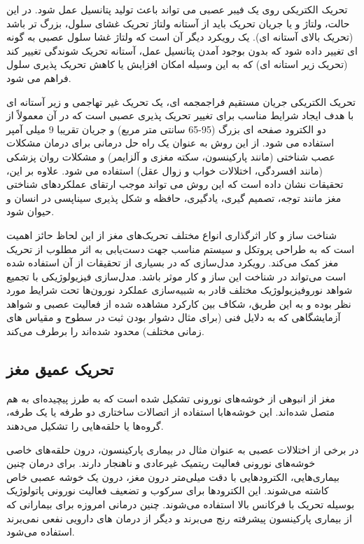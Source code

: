 تحریک الکتریکی روی یک فیبر عصبی می تواند باعث تولید پتانسیل عمل شود. در این حالت، ولتاژ و یا جریان تحریک باید از آستانه ولتاژ تحریک غشای سلول، بزرگ تر باشد (تحریک بالای آستانه ای). یک رویکرد دیگر آن است که ولتاژ غشا سلول عصبی به گونه ای تغییر داده شود که بدون بوجود آمدن پتانسیل عمل، آستانه تحریک شوندگی تغییر کند (تحریک زیر استانه ای) که به این وسیله امکان افزایش یا کاهش تحریک پذیری سلول فراهم می شود.

تحریک الکتریکی جریان مستقیم فراجمجمه ای، یک تحریک غیر تهاجمی و زیر آستانه ای با هدف ایجاد شرایط مناسب برای تغییر تحریک پذیری عصبی است که در آن معمولاً از دو الکترود صفحه ای بزرگ (95-65 سانتی متر مربع) و جریان تقریبا 9 میلی آمپر استفاده می شود. از این روش به عنوان یک راه حل درمانی برای درمان مشکلات عصب شناختی (مانند پارکینسون، سکته مغزی و آلزایمر) و مشکلات روان پزشکی (مانند افسردگی، اختلالات خواب و زوال عقل) استفاده می شود. علاوه بر این، تحقیقات نشان داده است که این روش می تواند موجب ارتقای عملکردهای شناختی مغز مانند توجه، تصمیم گیری، یادگیری، حافظه و شکل پذیری سیناپسی در انسان و حیوان شود.

شناخت ساز و کار اثرگذاری انواع مختلف تحریک‌های مغز از این لحاظ حائز اهمیت است که به طراحی پروتکل و سیستم مناسب جهت دست‌یابی به اثر مطلوب از تحریک مغز کمک می‌کند. رویکرد مدل‌سازی که در بسیاری از تحقیقات از آن استفاده شده است می‌تواند در شناخت این ساز و کار موثر باشد. مدل‌سازی فیزیولوژیکی با تجمیع شواهد نوروفیزیولوژیک مختلف قادر به شبیه‌سازی عملکرد نورون‌ها تحت شرایط مورد نظر بوده و به این طریق، شکاف بین کارکرد مشاهده شده از فعالیت عصبی و شواهد آزمایشگاهی که به دلایل فنی (برای مثال دشوار بودن ثبت در سطوح و مقیاس های زمانی مختلف) محدود شده‌اند را برطرف می‌کند. 


\subsection{تحریک عمیق مغز}

مغز از انبوهی از خوشه‌های نورونی تشکیل شده است که به طرز پیچیده‌ای به هم متصل شده‌اند. این خوشه‌هابا استفاده از اتصالات ساختاری دو طرفه یا یک طرفه، گروه‌ها یا حلقه‌هایی را تشکیل می‌دهند. 

در برخی از اختلالات عصبی به عنوان مثال در بیماری پارکینسون، درون حلقه‌های خاصی خوشه‌های نورونی فعالیت ریتمیک غیرعادی و ناهنجار دارند. برای درمان چنین بیماری‌هایی، الکترودهایی با دقت میلی‌متر درون مغز، درون یک خوشه عصبی خاص کاشته می‌شوند. این الکترودها برای سرکوب و تضعیف فعالیت نورونی پاتولوژیک بوسیله تحریک با فرکانس بالا استفاده می‌شوند. چنین درمانی امروزه برای بیمارانی که از بیماری پارکینسون پیشرفته رنج می‌برند و دیگر از درمان های دارویی نفعی نمی‌برند استفاده می‌شود. 

